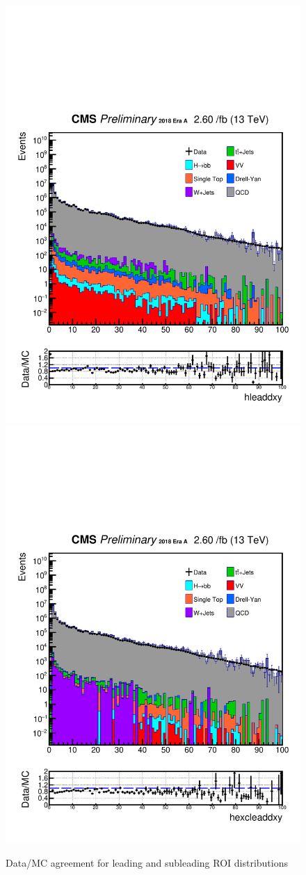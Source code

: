 \begin{figure}[h!]
  \caption{Data/MC agreement for leading and subleading ROI distributions}
  \label{fig:DataMCscore2}
  \centering
  \includegraphics[width=0.57\linewidth]{figs/Data_log_AnalysisNote_MS-15_ctauS-10_hleaddxy.pdf}
  \includegraphics[width=0.57\linewidth]{figs/Data_log_AnalysisNote_MS-15_ctauS-10_hexcleaddxy.pdf}

\end{figure}


